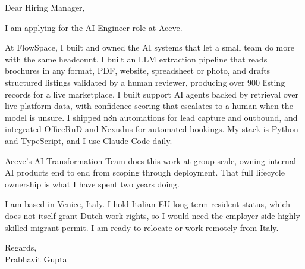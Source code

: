 \documentclass[a4paper,11pt]{article}
\begin{document}
Dear Hiring Manager,

I am applying for the AI Engineer role at Aceve.

At FlowSpace, I built and owned the AI systems that let a small team do more with the same headcount. I built an LLM extraction pipeline that reads brochures in any format, PDF, website, spreadsheet or photo, and drafts structured listings validated by a human reviewer, producing over 900 listing records for a live marketplace. I built support AI agents backed by retrieval over live platform data, with confidence scoring that escalates to a human when the model is unsure. I shipped n8n automations for lead capture and outbound, and integrated OfficeRnD and Nexudus for automated bookings. My stack is Python and TypeScript, and I use Claude Code daily.

Aceve's AI Transformation Team does this work at group scale, owning internal AI products end to end from scoping through deployment. That full lifecycle ownership is what I have spent two years doing.

I am based in Venice, Italy. I hold Italian EU long term resident status, which does not itself grant Dutch work rights, so I would need the employer side highly skilled migrant permit. I am ready to relocate or work remotely from Italy.

Regards,\\
Prabhavit Gupta
\end{document}
